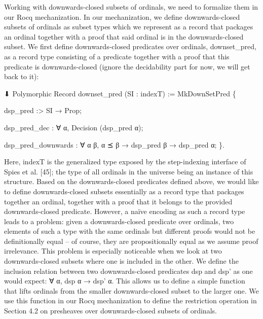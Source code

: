  
Working with downwards-closed subsets of ordinals, we need to formalize them in our Rocq mechanization. In our mechanization, we define downwards-closed subsets of ordinals as subset types which we represent as a record that packages an ordinal together with a proof that said ordinal is in the downwards-closed subset. We first define downwards-closed predicates over ordinals, downset\_pred, as a record type consisting of a predicate together with a proof that this predicate is downwards-closed (ignore the decidability part for now, we will get back to it):\par
  ⬇ 
 Polymorphic Record downset\_pred (SI : indexT) := MkDownSetPred \{ 
 
  dsp\_pred :> SI → Prop; 
 
  dsp\_pred\_dec : ∀ α, Decision (dsp\_pred α); 
 
  dsp\_pred\_downwards : ∀ α β, α ⪯ β → dsp\_pred β → dsp\_pred α; \}. 
  
Here, indexT is the generalized type exposed by the step-indexing interface of Spies et al. [45]; the type of all ordinals in the universe being an instance of this structure. Based on the downwards-closed predicates defined above, we would like to define downwards-closed subsets essentially as a record type that packages together an ordinal, together with a proof that it belongs to the provided downwards-closed predicate. However, a naïve encoding as such a record type leads to a problem: given a downwards-closed predicate over ordinals, two elements of such a type with the same ordinals but different proofs would not be definitionally equal – of course, they are propositionally equal as we assume proof irrelevance. This problem is especially noticeable when we look at two downwards-closed subsets where one is included in the other. We define the inclusion relation between two downwards-closed predicates dsp and dsp’ as one would expect: ∀ α, dsp α → dsp’ α. This allows us to define a simple function that lifts ordinals from the smaller downwards-closed subset to the larger one. We use this function in our Rocq mechanization to define the restriction operation in Section 4.2 on presheaves over downwards-closed subsets of ordinals.\par
 
 

